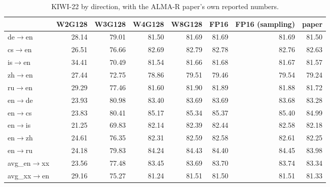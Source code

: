 \begin{table}[t]
\centering
\small
\begin{tabular}{lrrrrrrr}
\toprule
& W2G128 & W3G128 & W4G128 & W8G128 & FP16 & FP16 (sampling) & paper \\
\midrule
de$\rightarrow$en & 28.14 & 79.01 & 81.50 & 81.69 & 81.69 & 81.69 & 81.50 \\
cs$\rightarrow$en & 26.51 & 76.66 & 82.69 & 82.79 & 82.78 & 82.76 & 82.63 \\
is$\rightarrow$en & 34.41 & 70.49 & 81.54 & 81.66 & 81.68 & 81.67 & 81.57 \\
zh$\rightarrow$en & 27.44 & 72.75 & 78.86 & 79.51 & 79.46 & 79.54 & 79.24 \\
ru$\rightarrow$en & 29.29 & 77.46 & 81.60 & 81.90 & 81.89 & 81.88 & 81.72 \\
en$\rightarrow$de & 23.93 & 80.98 & 83.40 & 83.69 & 83.69 & 83.68 & 83.28 \\
en$\rightarrow$cs & 23.83 & 80.41 & 85.17 & 85.34 & 85.37 & 85.40 & 84.99 \\
en$\rightarrow$is & 21.25 & 69.83 & 82.14 & 82.39 & 82.44 & 82.58 & 82.18 \\
en$\rightarrow$zh & 24.61 & 76.35 & 82.31 & 82.59 & 82.58 & 82.61 & 82.25 \\
en$\rightarrow$ru & 24.18 & 79.83 & 84.24 & 84.43 & 84.40 & 84.45 & 83.98 \\
\midrule
avg\_en$\rightarrow$xx & 23.56 & 77.48 & 83.45 & 83.69 & 83.70 & 83.74 & 83.34 \\
avg\_xx$\rightarrow$en & 29.16 & 75.27 & 81.24 & 81.51 & 81.50 & 81.51 & 81.33 \\
\bottomrule
\end{tabular}
\caption{KIWI-22 by direction, with the ALMA-R paper's own reported numbers.}
\label{tab:kiwi-22}
\end{table}

